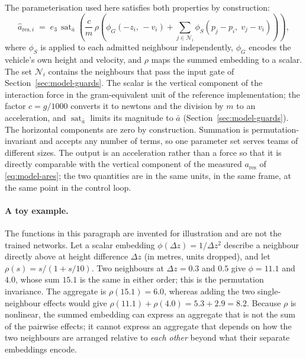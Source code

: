 The parameterisation used here satisfies both properties by construction:
%
\begin{equation}
  \hat{a}_{\mathrm{res},i}
  \;=\; e_3\,\operatorname{sat}_{\bar a}\!\left( \frac{c}{m}\,
     \rho\!\left( \phi_G\!\left(-z_i,\, -v_i\right)
       + \sum_{j \in \mathcal{N}_i} \phi_S\!\left( p_j - p_i,\; v_j - v_i \right) \right) \right),
  \label{eq:model-deepsets}
\end{equation}
%
where $\phi_S$ is applied to each admitted neighbour independently, $\phi_G$ encodes the vehicle's
own height and velocity, and $\rho$ maps the summed embedding to a scalar. The set
$\mathcal{N}_i$ contains the neighbours that pass the input gate of
Section~\ref{sec:model-guards}. The scalar is the vertical component of the interaction force in
the gram-equivalent unit of the reference implementation; the factor $c = g/1000$ converts it to
newtons and the division by $m$ to an acceleration, and $\operatorname{sat}_{\bar a}$ limits its
magnitude to $\bar a$ (Section~\ref{sec:model-guards}). The horizontal components are zero by
construction. Summation is permutation-invariant and accepts any number of terms, so one parameter
set serves teams of different sizes. The output is an acceleration rather than a force so that it
is directly comparable with the vertical component of the measured $a_{\mathrm{res}}$ of
\eqref{eq:model-ares}; the two quantities are in the same units, in the same frame, at the same
point in the control loop.

\paragraph{A toy example.} The functions in this paragraph are invented for illustration and are
not the trained networks. Let a scalar embedding $\phi(\Delta z) = 1/\Delta z^2$ describe a
neighbour directly above at height difference $\Delta z$ (in metres, units dropped), and let
$\rho(s) = s/(1 + s/10)$. Two neighbours at $\Delta z = 0.3$ and $0.5$ give
$\phi = 11.1$ and $4.0$, whose sum $15.1$ is the same in either order; this is the permutation
invariance. The aggregate is $\rho(15.1) = 6.0$, whereas adding the two single-neighbour effects
would give $\rho(11.1) + \rho(4.0) = 5.3 + 2.9 = 8.2$. Because $\rho$ is nonlinear, the summed
embedding can express an aggregate that is not the sum of the pairwise effects; it cannot express
an aggregate that depends on how the two neighbours are arranged relative to \emph{each other}
beyond what their separate embeddings encode.

